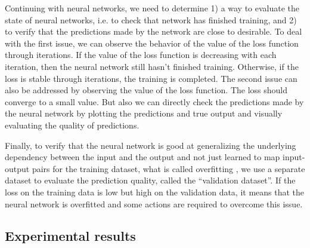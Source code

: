 Continuing with neural networks, we need to determine 1) a way to evaluate the state of neural networks, i.e. to check that network has finished training, and 2) to verify that the predictions made by the network are close to desirable. To deal with the first issue, we can observe the behavior of the value of the loss function through iterations. If the value of the loss function is decreasing with each iteration, then the neural network still hasn't finished training. Otherwise, if the loss is stable through iterations, the training is completed. The second issue can also be addressed by observing the value of the loss function. The loss should converge to a small value. But also we can directly check the predictions made by the neural network by plotting the predictions and true output and visually evaluating the quality of predictions.

Finally, to verify that the neural network is good at generalizing the underlying dependency between the input and the output and not just learned to map input-output pairs for the training dataset, what is called overfitting \cite{15}, we use a separate dataset to evaluate the prediction quality, called the ``validation dataset''. If the loss on the training data is low but high on the validation data, it means that the neural network is overfitted and some actions are required to overcome this issue.

\subsection{Experimental results} \label{experiments_results}

